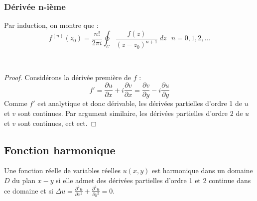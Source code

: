 		
		\subsubsection{Dérivée n-ième}
		Par induction, on montre que :
		\begin{equation}
		f^{(n)}(z_0) = \frac{n!}{2\pi i}\oint_\mathcal{C}\frac{f(z)}{(z-z_0)^{n+1}}\ dz\ \ \ n=0,1,
		2,\dots
		\end{equation}
		
		\ \ \\
		
		\begin{proof}
		Considérons la dérivée première de $f$ :
		\begin{equation}
		f' = \frac{\partial u}{\partial x} + i \frac{\partial v}{\partial x} = \frac{\partial v}{\partial
		 y} - i \frac{\partial u}{\partial y}
		\end{equation}
		Comme $f'$ est analytique et donc dérivable, les dérivées partielles d'ordre 1 de $u$ et $v$ 
		sont continues. Par argument similaire, les dérivées partielles d'ordre 2 de $u$ et $v$ sont
		continues, ect ect.
		\end{proof}

	\subsection{Fonction harmonique}
	Une fonction réelle de variables réelles $u(x,y)$ est harmonique dans un domaine $D$ du plan $x-
	y$ si elle admet des dérivées partielles d'ordre 1 et 2 continue dans ce domaine et si $\Delta u
	= \frac{\partial^2u}{\partial x^2}+\frac{\partial^2u}{\partial y^2} = 0$.\\
	
